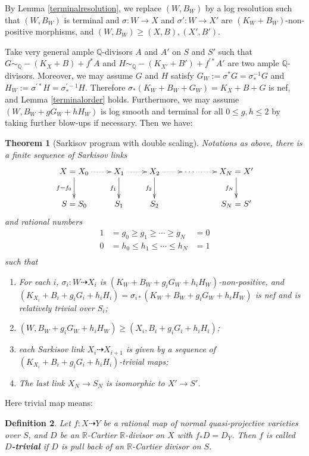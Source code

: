 \documentclass[11pt]{amsart}
\newtheorem{defn}{Definition}[section]
\newtheorem{thm}[defn]{Theorem}
\begin{document}
By Lemma \ref{terminalresolution}, we  replace $(W,B_W)$ by a log resolution such that $(W,B_{W})$ is terminal and $\sigma:W\to X$ and $\sigma':W\to X'$ are $(K_W+B_W)$-non-positive morphisms, and $(W,B_W)\geqslant (X,B),(X',B')$. 

Take  very general ample $\mathbb{Q}$-divisors $ A $ and $ A' $ on $ S $ and $ S' $ such that $ G\sim_{\mathbb{Q}}-(K_X+B)+f^*A $ and $ H\sim_{\mathbb{Q}}-(K_{X'}+B')+f^{'*}A' $ are two ample $\mathbb{Q}$-divisors. Moreover, we may assume $ G $ and $ H $ satisfy $G_{W}:= \sigma^*G=\sigma^{-1}_*G $ and $ H_{W}:=\sigma^{'*}H=\sigma^{'-1}_*H $. Therefore $\sigma_{*}(K_{W}+B_{W}+G_{W})=K_{X}+B+G$ is nef, and Lemma \ref{terminalorder} holds.
Furthermore, we may assume $(W,B_W+gG_W+hH_W)$ is log smooth and terminal for all $0\leqslant g,h\leqslant 2$ by taking further blow-ups if necessary.
Then we have:
\begin{thm}[Sarkisov program with double scaling]\label{main2}
  \cite[Claim 13.12]{haconMinimalModelProgram2012}
Notations as above, there is a finite sequence of Sarkisov links
\[
  \xymatrix{
    X=X_0\ar@{.>}[r]\ar[d]_{f=f_{0}}&X_{1}\ar@{.>}[r]\ar[d]_{f_{1}}& X_{2}\ar[d]_{f_{2}}\ar@{.>}[r] &\cdots\ar@{.>}[r]&X_N=X'\ar[d]_{f_{N}} \\
    S=S_{0}&S_{1} &S_{2}&&S_N=S'
  }
\]
and rational numbers
\[
  \begin{aligned}
    1&=g_0\geqslant g_1 \geqslant \cdots \geqslant g_N&=0\\
    0&=h_0\leqslant h_{1} \leqslant \cdots \leqslant h_N&=1\\
  \end{aligned}
\]
such that 
\begin{enumerate}
  \item For each $i$, $\sigma_i:W\dashrightarrow  X_{i}$ is $(K_{W}+B_{W}+g_{i}G_{W}+h_{i}H_{W})$-non-positive, and $(K_{X_{i}}+B_{i}+g_{i}G_{i}+h_{i}H_{i})=\sigma_{i*}(K_{W}+B_{W}+g_{i}G_{W}+h_{i}H_{W})$ is nef and is relatively trivial over $S_{i}$;
  \item $(W,B_{W}+g_{i}G_{W}+h_{i}H_{W})\geqslant (X_{i},B_{i}+g_{i}G_{i}+h_{i}H_{i})$;
  \item each Sarkisov link $X_{i}\dashrightarrow X_{i+1}$ is given by a sequence of $(K_{X_{i}}+B_{i}+g_{i}G_{i}+h_{i}H_{i})$-trivial maps;
    \item  The last link $X_{N} \to S_{N}$ is isomorphic to $X'\to S'$.
\end{enumerate}
\end{thm}
Here trivial map means:
\begin{defn}\label{rivialmap}
  \cite[\S 13.2]{haconMinimalModelProgram2012} Let $f:X\dashrightarrow Y$ be a rational map of normal quasi-projective varieties over $S$, and $D$ be an $\mathbb{R}$-Cartier $\mathbb{R}$-divisor  on $X$ with $f_*D=D_Y$. Then $f$ is called \textbf{$D$-trivial} if $D$ is pull back of an $\mathbb{R}$-Cartier divisor on $S$.
\end{defn}
\end{document}
